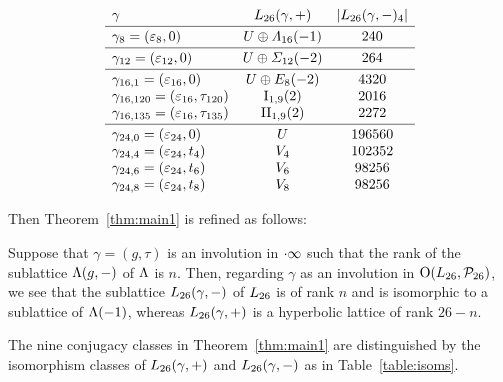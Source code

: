 \documentclass{amsart} %
\begin{document}
\begin{table}
\[
\begin{array}{lc c }
\gamma & \Lts(\gamma, +) & |\Lts(\gamma, -)_4|
\mystrutd{5pt} \\
\hline 
\gamma_{8}=(\vep_8, 0) & U\oplus \Lamsxtn(-1) & 240
\mystruthd{10pt}{5pt} \\
\hline
\gamma_{12}=(\vep_{12}, 0) & U\oplus \Sigmatwlv(-2) & 264
\mystruthd{10pt}{5pt} \\
\hline
\mystruth{10pt}
\gamma_{16, 1}=(\vep_{16}, 0) &U\oplus E_8(-2) &4320\\
\gamma_{16, 120} =(\vep_{16}, \tau_{120}) & \typeILat_{1, 9}(2) &2016\\
\gamma_{16, 135} =(\vep_{16}, \tau_{135}) & \typeIILat_{1, 9}(2) &2272
\mystrutd{5pt}\\
\hline
\mystruth{10pt}
\gamma_{24, 0}=( \vep_{24}, 0)& U &196560\\
\gamma_{24, 4}=(\vep_{24},t_4)& V_{4} & 102352 \\
\gamma_{24, 6}=( \vep_{24}, t_6) & V_{6} &98256\\
\gamma_{24, 8}=( \vep_{24}, t_8) & V_{8} &98256
\end{array}
\]
\vskip 10pt
\caption{$\Lts(\gamma, +)$ and $\Lts(\gamma,-)$}\label{table:isoms}
\end{table}
%
\par
Then Theorem~\ref{thm:main1} is refined as follows:
%
\begin{theorem}\label{thm:main2}
Suppose that $\gamma=(g, \tau)$ is an involution 
in $\cdot \infty$ such that the rank of the sublattice $\Lambda(g, -)$ of $\Lambda$ is $n$.
Then,
regarding  $\gamma$ as an involution in $\mathord{\mathrm{O}}(L_{26}, \mathord{\mathcal{P}}_{26})$,
we see that 
the sublattice  $\Lts(\gamma, -)$ of $L_{26}$ is of rank $n$ and is isomorphic to a sublattice of $\Lambda (-1)$, 
whereas $\Lts(\gamma, +)$ is a hyperbolic lattice of rank $26-n$.
\par
The nine conjugacy classes in Theorem~\ref{thm:main1} are distinguished by 
the isomorphism classes of $\Lts(\gamma, +)$ and $\Lts(\gamma,-)$ as in Table~\ref{table:isoms}.
\end{theorem}
\end{document}
